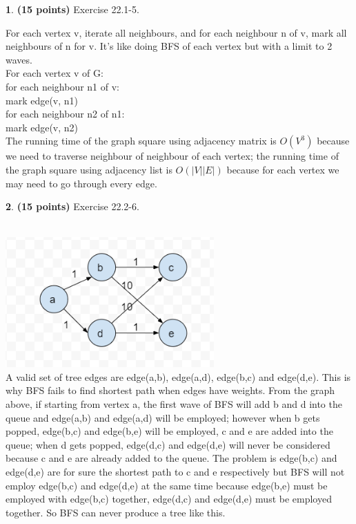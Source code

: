 \documentclass[11pt]{article}
\theoremstyle{definition}
\theoremstyle{theorem}
\newtheorem{prob}{}
\newcommand{\solution}{\medskip\noindent{\color{DarkBlue}\textbf{Solution:}}}
\begin{document}
\begin{prob} \textbf{(15 points)} Exercise 22.1-5.
\end{prob}
\solution
For each vertex v, iterate all neighbours, and for each neighbour n of v, mark all neighbours of n for v. It's like doing BFS of each vertex but with a limit to 2 waves.\\
For each vertex v of G:\\
\null\qquad for each neighbour n1 of v:\\
\null\qquad\qquad mark edge(v, n1)\\
\null\qquad\qquad for each neighbour n2 of n1:\\
\null\qquad\qquad\qquad mark edge(v, n2)\\
The running time of the graph square using adjacency matrix is $O(V^3)$ because we need to traverse neighbour of neighbour of each vertex; the running time of the graph square using adjacency list is $O(|V||E|)$ because for each vertex we may need to go through every edge.
\begin{prob} \textbf{(15 points)} Exercise 22.2-6.
\end{prob}
\solution\\
\includegraphics[width=8cm, height=5cm]{1}
\\A valid set of tree edges are edge(a,b), edge(a,d), edge(b,c) and edge(d,e). This is why BFS fails to find shortest path when edges have weights. From the graph above, if starting from vertex a, the first wave of BFS will add b and d into the queue and edge(a,b) and edge(a,d) will be employed; however when b gets popped, edge(b,c) and edge(b,e) will be employed, c and e are added into the queue; when d gets popped, edge(d,c) and edge(d,e) will never be considered because c and e are already added to the queue. The problem is edge(b,c) and edge(d,e) are for sure the shortest path to c and e respectively but BFS will not employ edge(b,c) and edge(d,e) at the same time because edge(b,e) must be employed with edge(b,c) together, edge(d,c) and edge(d,e) must be employed together. So BFS can never produce a tree like this.\\
\end{document}
